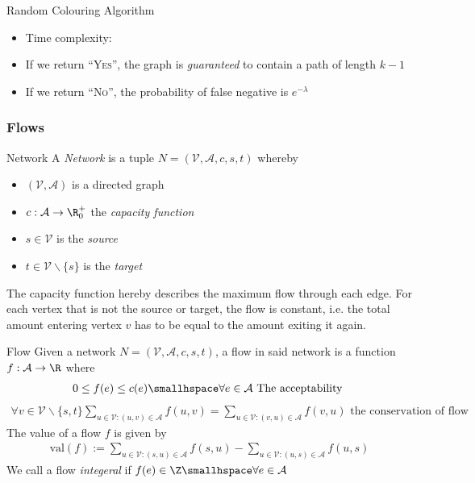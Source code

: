 \begin{theorem}[]{Random Colouring Algorithm}
    \begin{itemize}
        \item Time complexity: 
        \item If we return ``\textsc{Yes}'', the graph is \textit{guaranteed} to contain a path of length $k - 1$
        \item If we return ``\textsc{No}'', the probability of false negative is $e^{-\lambda}$
    \end{itemize}
\end{theorem}



\newpage
\setcounter{all}{4}
\subsubsection{Flows}
\begin{definition}[]{Network}
    A \textit{Network} is a tuple $N = (\mathcal{V}, \mathcal{A}, c, s, t)$ whereby
    \begin{itemize}
        \item $(\mathcal{V}, \mathcal{A})$ is a directed graph
        \item $c: \mathcal{A} \rightarrow \R_0^+$ the \textit{capacity function}
        \item $s \in \mathcal{V}$ is the \textit{source}
        \item $t \in \mathcal{V}\backslash \{s\}$ is the \textit{target}
    \end{itemize}
\end{definition}
The capacity function hereby describes the maximum flow through each edge. For each vertex that is not the source or target, the flow is constant, i.e. the total amount entering vertex $v$ has to be equal to the amount exiting it again.

\begin{definition}[]{Flow}
    Given a network $N = (\mathcal{V}, \mathcal{A}, c, s, t)$, a flow in said network is a function $f: \mathcal{A} \rightarrow \R$ where
    \begin{align*}
        0 \leq f(e) \leq c(e) \smallhspace \forall e \in \mathcal{A} \text{ The acceptability }
    \end{align*}
    \begin{align*}
        \forall v \in \mathcal{V} \backslash \{s, t\} \sum_{u \in \mathcal{V}: (u, v) \in \mathcal{A}} f(u, v) = \sum_{u \in \mathcal{V}: (v, u) \in \mathcal{A}} f(v, u) \text{ the conservation of flow }
    \end{align*}
    The value of a flow $f$ is given by
    \begin{align*}
        \text{val}(f) := \sum_{u \in \mathcal{V}: (s, u) \in \mathcal{A}} f(s, u) - \sum_{u \in \mathcal{V}: (u, s) \in \mathcal{A}} f(u, s)
    \end{align*}
    We call a flow \textit{integeral} if $f(e) \in \Z \smallhspace \forall e \in \mathcal{A}$
\end{definition}


